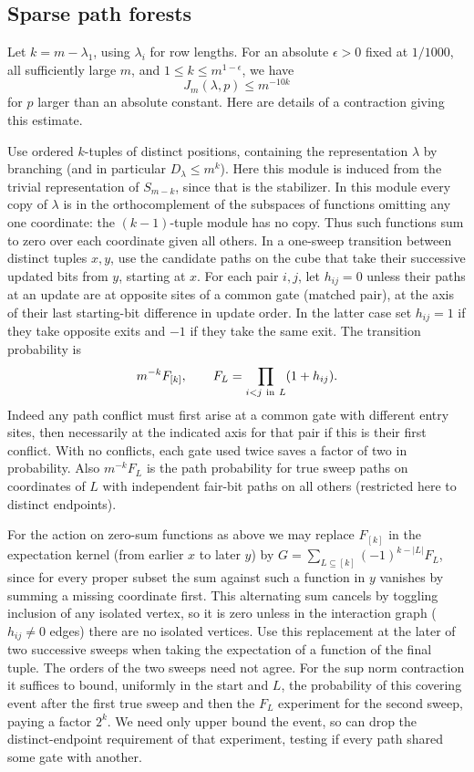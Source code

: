 \subsection{Sparse path forests}


Let \(k=m-\lambda_1\), using \(\lambda_i\) for row lengths. For an absolute \(\epsilon>0\) fixed at \(1/1000\), all sufficiently large \(m\), and \(1\le k\le m^{1-\epsilon}\), we have
\begin{equation}
 J_m(\lambda,p)\le m^{-10k}
 \label{ten:inverse:eq:1}
\end{equation}
for \(p\) larger than an absolute constant. Here are details of a contraction giving this estimate.

Use ordered \(k\)-tuples of distinct positions, containing the representation \(\lambda\) by branching (and in particular \(D_\lambda\le m^k\)). Here this module is induced from the trivial representation of \(S_{m-k}\), since that is the stabilizer. In this module every copy of \(\lambda\) is in the orthocomplement of the subspaces of functions omitting any one coordinate: the \((k-1)\)-tuple module has no copy. Thus such functions sum to zero over each coordinate given all others. In a one-sweep transition between distinct tuples \(x,y\), use the candidate paths on the cube that take their successive updated bits from \(y\), starting at \(x\). For each pair \(i,j\), let \(h_{ij}=0\) unless their paths at an update are at opposite sites of a common gate (matched pair), at the axis of their last starting-bit difference in update order. In the latter case set \(h_{ij}=1\) if they take opposite exits and \(-1\) if they take the same exit. The transition probability is
\[
 m^{-k}F_{[k]},\qquad F_L=\prod_{i<j\ {\rm in}\ L}(1+h_{ij}).
\]
Indeed any path conflict must first arise at a common gate with different entry sites, then necessarily at the indicated axis for that pair if this is their first conflict. With no conflicts, each gate used twice saves a factor of two in probability. Also \(m^{-k}F_L\) is the path probability for true sweep paths on coordinates of \(L\) with independent fair-bit paths on all others (restricted here to distinct endpoints).

For the action on zero-sum functions as above we may replace \(F_{[k]}\) in the expectation kernel (from earlier \(x\) to later \(y\)) by \(G=\sum_{L\subseteq[k]}(-1)^{k-|L|}F_L\), since for every proper subset the sum against such a function in \(y\) vanishes by summing a missing coordinate first. This alternating sum cancels by toggling inclusion of any isolated vertex, so it is zero unless in the interaction graph (\(h_{ij}\ne0\) edges) there are no isolated vertices. Use this replacement at the later of two successive sweeps when taking the expectation of a function of the final tuple. The orders of the two sweeps need not agree. For the sup norm contraction it suffices to bound, uniformly in the start and \(L\), the probability of this covering event after the first true sweep and then the \(F_L\) experiment for the second sweep, paying a factor \(2^k\). We need only upper bound the event, so can drop the distinct-endpoint requirement of that experiment, testing if every path shared some gate with another.

